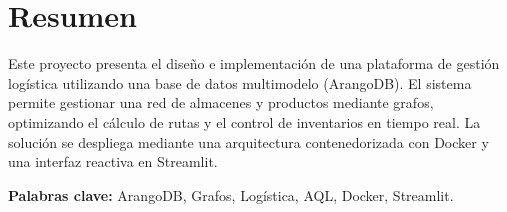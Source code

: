 \chapter*{Resumen}
Este proyecto presenta el diseño e implementación de una plataforma de gestión logística utilizando una base de datos multimodelo (ArangoDB). El sistema permite gestionar una red de almacenes y productos mediante grafos, optimizando el cálculo de rutas y el control de inventarios en tiempo real. La solución se despliega mediante una arquitectura contenedorizada con Docker y una interfaz reactiva en Streamlit.
\vspace{.5cm}

\textbf{Palabras clave:} ArangoDB, Grafos, Logística, AQL, Docker, Streamlit.